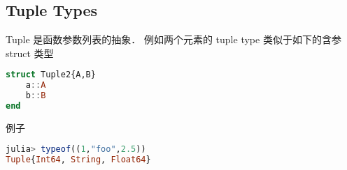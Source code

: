 \subsection{Tuple Types}
Tuple 是函数参数列表的抽象． 例如两个元素的 tuple type 类似于如下的含参 struct 类型
\begin{lstlisting}[language=julia]
struct Tuple2{A,B}
    a::A
    b::B
end
\end{lstlisting}
例子
\begin{lstlisting}[language=julia]
julia> typeof((1,"foo",2.5))
Tuple{Int64, String, Float64}
\end{lstlisting}

